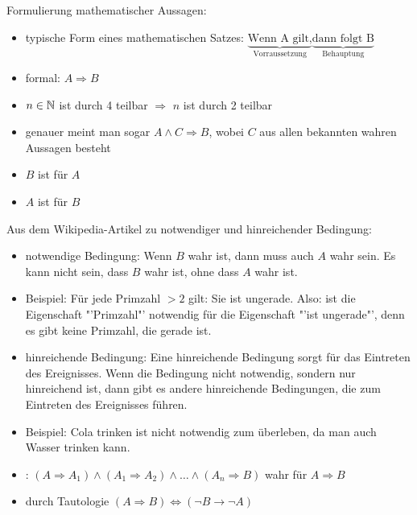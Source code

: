 Formulierung mathematischer Aussagen:
\begin{itemize}
	\item typische Form eines mathematischen Satzes: $\underbrace{\text{Wenn A gilt,}}_\text{Vorraussetzung}\underbrace{\text{dann folgt B}}_\text{Behauptung}$
	\item formal: $A\Rightarrow B$
\end{itemize}

\begin{example}
	\begin{itemize}
		\item $n\in\mathbb{N}$ ist durch 4 teilbar $\Rightarrow$ $n$ ist durch 2 teilbar
		\item genauer meint man sogar $A\land C\Rightarrow B$, wobei $C$ aus allen bekannten 
		wahren Aussagen besteht
		\item $B$ ist  für $A$
		\item $A$ ist  für $B$
	\end{itemize}
\end{example}

\begin{*anmerkung}
	Aus dem Wikipedia-Artikel zu notwendiger und hinreichender Bedingung:
	\begin{itemize}
		\item notwendige Bedingung: Wenn $B$ wahr ist, dann muss auch $A$ wahr sein. Es kann nicht sein, dass $B$ wahr ist, ohne dass $A$ wahr ist. 
		\item Beispiel: Für jede Primzahl $>2$ gilt: Sie ist ungerade. Also: ist die Eigenschaft "'Primzahl"' 
		notwendig für die Eigenschaft "'ist ungerade"', denn es gibt keine Primzahl, die gerade ist.
		\item hinreichende Bedingung: Eine hinreichende Bedingung sorgt für das Eintreten des Ereignisses. Wenn die Bedingung nicht notwendig, sondern nur hinreichend ist, dann gibt es andere hinreichende Bedingungen, die zum Eintreten des Ereignisses führen.
		\item Beispiel: Cola trinken ist nicht notwendig zum überleben, da man auch Wasser trinken kann.
	\end{itemize}
\end{*anmerkung}

\begin{definition}
	\begin{itemize}
		\item {}: $(A\Rightarrow A_1)\land(A_1\Rightarrow A_2)\land\dotsc\land(A_n\Rightarrow B)$ wahr für $A\Rightarrow B$
		\item {} durch Tautologie $(A\Rightarrow B)\Leftrightarrow (\neg B\rightarrow \neg A)$
	\end{itemize}
\end{definition}

